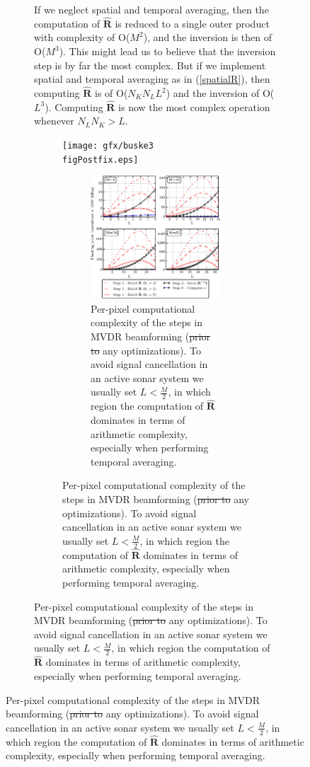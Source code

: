 \documentclass[12pt,journal,draftclsnofoot,onecolumn]{IEEEtran}
\let\MYoriglatexcaption\caption               %
\renewcommand{\caption}[2][\relax]{\MYoriglatexcaption[#2]{#2}}
\newcommand\mat[1]{\boldsymbol{#1}}
\newcommand\1{\vec 1}
\newcommand*\eR{\mat{\hat R}}
\providecommand{\DIFaddtex}[1]{{\protect\color{blue}\uwave{#1}}} %
\providecommand{\DIFdeltex}[1]{{\protect\color{red}\sout{#1}}}                      %
\providecommand{\DIFaddFL}[1]{\DIFadd{#1}} %
\providecommand{\DIFdelFL}[1]{\DIFdel{#1}} %
\providecommand{\DIFaddbeginFL}{} %
\providecommand{\DIFaddendFL}{} %
\providecommand{\DIFdelbeginFL}{} %
\providecommand{\DIFdelendFL}{} %
\providecommand{\DIFadd}[1]{\texorpdfstring{\DIFaddtex{#1}}{#1}} %
\providecommand{\DIFdel}[1]{\texorpdfstring{\DIFdeltex{#1}}{}} %
\begin{document}
\begin{figure}
\begin{figure}
If we neglect spatial and temporal averaging, then the computation of $\eR$ is reduced to a single outer product with complexity of O($M^2$), and the inversion is then of O($M^3$). This might lead us to believe that the inversion step is by far the most complex. But if we implement spatial and temporal averaging as in (\ref{spatialR}), then computing $\eR$ is of O($N_K N_L L^2$) and the inversion of O($L^3$). Computing $\eR$ is now the most complex operation whenever $N_LN_K>L$.
\ifPeerReview
\begin{figure}
[!t]\centering
\DIFdelbeginFL %
\DIFdelendFL \DIFaddbeginFL \texttt{[image: gfx/buske3\\figPostfix.eps]}
\DIFaddendFL \else
\begin{figure}
[!t]\centering
\includegraphics[width=\linewidth]{gfx/mvdr_complexity.eps}
\fi%
\caption{Per-pixel computational complexity of the steps in MVDR beamforming (\DIFdelbeginFL \DIFdelFL{prior to }\DIFdelendFL \DIFaddbeginFL \DIFaddFL{before }\DIFaddendFL any optimizations). To avoid signal cancellation in an active sonar system we usually set $L<\frac{M}{2}$, in which region the computation of $\eR$ dominates in terms of arithmetic complexity, especially when performing temporal averaging.}\label{mvdr_complexity}
\end{figure}

\end{figure}
\end{figure}
\end{figure}
\end{document}
